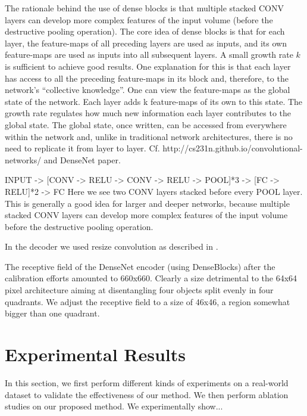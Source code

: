 \documentclass[12pt,a4paper]{article}
\begin{document}
\par The rationale behind the use of dense blocks is that multiple stacked CONV layers can develop more complex features of the input volume (before the destructive pooling operation). The core idea of dense blocks is that for each layer, the feature-maps of all preceding layers are used as inputs, and its own feature-maps are used as inputs into all subsequent layers. A small growth rate $k$ is sufficient to achieve good results. One explanation for this is that each layer has access to all the preceding feature-maps in its block and, therefore, to the network’s “collective knowledge”. One can view the feature-maps as the global state of the network. Each layer adds k feature-maps of its own to this state. The growth rate regulates how much new information each layer contributes to the global state. The global state, once written, can be accessed from everywhere within the network and, unlike in traditional network architectures, there is no need to replicate it from layer to layer.
Cf. http://cs231n.github.io/convolutional-networks/ and DenseNet paper.

\par INPUT -> [CONV -> RELU -> CONV -> RELU -> POOL]*3 -> [FC -> RELU]*2 -> FC
Here we see two CONV layers stacked before every POOL layer. This is generally a good
idea for larger and deeper networks, because multiple stacked CONV layers can develop
more complex features of the input volume before the destructive pooling operation.

\par In the decoder we used resize convolution as described in \cite{odena_dumoulin_olah_2016}.

\par The receptive field of the DenseNet encoder (using DenseBlocks) after the calibration efforts amounted to 660x660. Clearly a size detrimental to the 64x64 pixel architecture aiming at disentangling four objects split evenly in four quadrants. We adjust the receptive field to a size of 46x46, a region somewhat bigger than one quadrant.

\section{Experimental Results}
In this section, we first perform different kinds of experiments on a real-world dataset to validate the
effectiveness of our method. We then perform ablation studies on our proposed
method. 
We experimentally show...
\end{document}
